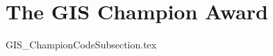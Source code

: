 \documentclass[class=book , crop=false]{standalone}
\begin{document}
	\section{The GIS Champion Award}

		{GIS_ChampionCodeSubsection.tex}
		
\end{document}
